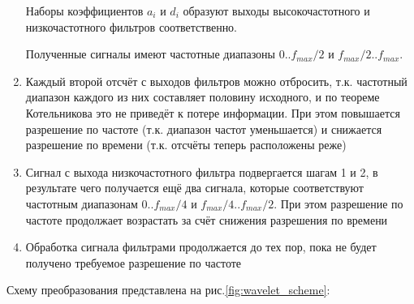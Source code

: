 \begin{enumerate}

Наборы коэффициентов $a_i$ и $d_i$ образуют выходы высокочастотного и низкочастотного фильтров соответственно.


Полученные сигналы имеют частотные диапазоны $0..f_{max}/2$ и $f_{max}/2..f_{max}$.
\item Каждый второй отсчёт с выходов фильтров можно отбросить, т.к. частотный диапазон каждого из них составляет половину исходного, и по теореме Котельникова это не приведёт к потере информации. При этом повышается разрешение по частоте (т.к. диапазон частот уменьшается) и снижается разрешение по времени (т.к. отсчёты теперь расположены реже)
\item Сигнал с выхода низкочастотного фильтра подвергается шагам 1 и 2, в результате чего получается ещё два сигнала, которые соответствуют частотным диапазонам $0..f_{max}/4$ и $f_{max}/4..f_{max}/2$. При этом разрешение по частоте продолжает возрастать за счёт снижения разрешения по времени
\item Обработка сигнала фильтрами продолжается до тех пор, пока не будет получено требуемое разрешение по частоте
\end{enumerate}

Схему преобразования представлена на рис.\ref{fig:wavelet_scheme}\cite{wavelet_structure}:



